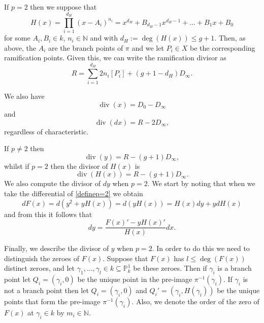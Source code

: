 \documentclass[11pt]{article} %
\theoremstyle{plain}
\theoremstyle{remark}
\newcommand{\NN}{{\mathbb N}}
\DeclareMathOperator{\di}{div}
\begin{document}
If $p=2$ then we suppose that
\begin{equation}\label{capitalh}
H(x) = \prod_{i=1}^{d_H} (x-A_i)^{n_i} = x^{d_H} + B_{{d_H}-1}x^{{d_H}-1} + \ldots + B_1x + B_0
\end{equation}
for some $A_i, B_i \in  k$, $n_i \in \mathbb N$ and with  ${d_H} := \deg(H(x)) \leq g+1$.
Then, as above, the $A_i$ are the branch points of $\pi$ and we let $P_i \in X$ be the corresponding ramification points.
Given this, we can write the ramification divisor as
\[
R = \sum_{i=1}^{d_H} 2n_i[P_i] + (g+1-{d_H})D_\infty.
\]


We also have
\begin{equation}\label{divxp=2}
\di (x)  = D_0 - D_\infty
\end{equation}
and
\begin{equation}\label{differentialdivisor}
\di(dx) = R - 2D_\infty,
\end{equation}
regardless of characteristic.

If $p \neq 2$ then 
\begin{equation}\label{pnot2divisors}
\di(y)  = R - (g+1)D_\infty,
\end{equation}
whilst if $p=2$ then the divisor of $H(x)$ is
\begin{equation}\label{divisorofH}
\di (H(x))  = R - (g+1)D_\infty. 
\end{equation}
We also compute the divisor of $dy$ when $p=2$.
We start by noting that when we take the differential of \eqref{definep=2} we obtain
\[
dF(x) = d\left(y^2 + yH(x) \right) = d(yH(x)) = H(x)dy + ydH(x)
\]
and from this it follows that
\begin{equation}\label{divdyp=2}
dy = \frac{F(x)'-yH(x)'}{H(x)}dx.
\end{equation}

Finally, we describe the divisor of $y$ when $p=2$.
In order to do this we need to distinguish the zeroes of $F(x)$.
Suppose that $F(x)$ has $l \leq \deg(F(x))$ distinct zeroes, and let $\gamma_1, \ldots, \gamma_l \in k \subseteq \mathbb P_k^1$ be these zeroes.
Then if $\gamma_i$ is a branch point let $Q_i = (\gamma_i, 0)$ be the unique point in the pre-image $\pi^{-1}(\gamma_i)$.
If $\gamma_i$ is not a branch point then let $Q_i = (\gamma_i, 0)$ and $Q_i' = (\gamma_i, H(\gamma_i))$ be the unique points that form the pre-image $\pi^{-1}(\gamma_i)$.
Also, we denote the order of the zero of $F(x)$ at $\gamma_i \in k$ by $m_i \in \NN$.
\end{document}
